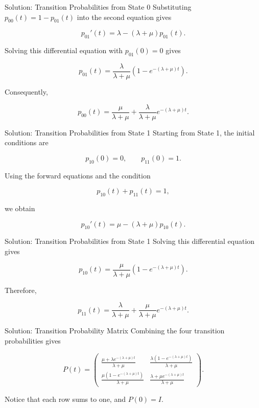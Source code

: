 \documentclass[
  ignorenonframetext,
  aspectratio=169,
]{beamer}
\begin{document}
\begin{frame}{Solution: Transition Probabilities from State 0}
\protect{}\label{solution-transition-probabilities-from-state-0-1}
Substituting \(p_{00}(t)=1-p_{01}(t)\) into the second equation gives

\[
p_{01}'(t)
=
\lambda-(\lambda+\mu)p_{01}(t).
\]

Solving this differential equation with \(p_{01}(0)=0\) gives

\[
\boxed{
p_{01}(t)
=
\frac{\lambda}{\lambda+\mu}
\left(1-e^{-(\lambda+\mu)t}\right).
}
\]

Consequently,

\[
\boxed{
p_{00}(t)
=
\frac{\mu}{\lambda+\mu}
+
\frac{\lambda}{\lambda+\mu}
e^{-(\lambda+\mu)t}.
}
\]
\end{frame}

\begin{frame}{Solution: Transition Probabilities from State 1}
\protect{}\label{solution-transition-probabilities-from-state-1}
Starting from State 1, the initial conditions are

\[
p_{10}(0)=0,
\qquad
p_{11}(0)=1.
\]

Using the forward equations and the condition

\[
p_{10}(t)+p_{11}(t)=1,
\]

we obtain

\[
p_{10}'(t)
=
\mu-(\lambda+\mu)p_{10}(t).
\]
\end{frame}

\begin{frame}{Solution: Transition Probabilities from State 1}
\protect{}\label{solution-transition-probabilities-from-state-1-1}
Solving this differential equation gives

\[
\boxed{
p_{10}(t)
=
\frac{\mu}{\lambda+\mu}
\left(1-e^{-(\lambda+\mu)t}\right).
}
\]

Therefore,

\[
\boxed{
p_{11}(t)
=
\frac{\lambda}{\lambda+\mu}
+
\frac{\mu}{\lambda+\mu}
e^{-(\lambda+\mu)t}.
}
\]
\end{frame}

\begin{frame}{Solution: Transition Probability Matrix}
\protect{}\label{solution-transition-probability-matrix}
Combining the four transition probabilities gives

\[
\boxed{
P(t)=
\begin{pmatrix}
\displaystyle
\frac{\mu+\lambda e^{-(\lambda+\mu)t}}
{\lambda+\mu}
&
\displaystyle
\frac{\lambda(1-e^{-(\lambda+\mu)t})}
{\lambda+\mu}
\\[12pt]
\displaystyle
\frac{\mu(1-e^{-(\lambda+\mu)t})}
{\lambda+\mu}
&
\displaystyle
\frac{\lambda+\mu e^{-(\lambda+\mu)t}}
{\lambda+\mu}
\end{pmatrix}.
}
\]

Notice that each row sums to one, and \(P(0)=I\).
\end{frame}
\end{document}
